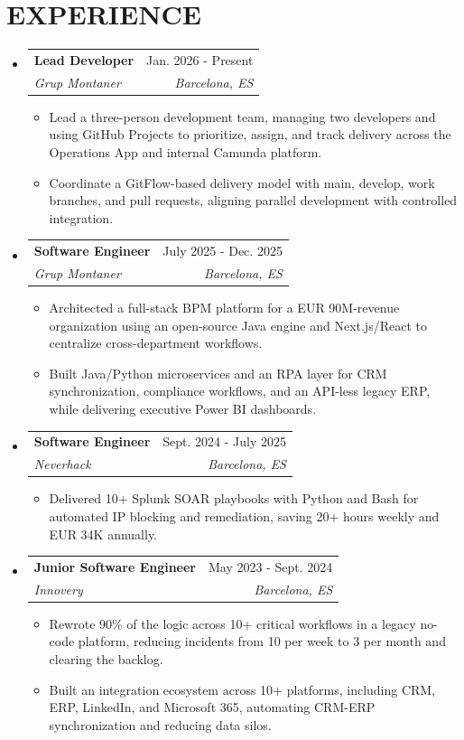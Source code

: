 \documentclass[letterpaper,11pt]{article}
\makeatletter
\newcommand{\resumeItem}[1]{
  \item\small{
    {#1 \vspace{-2pt}}
  }
}
\newcommand{\resumeSubheading}[4]{
  \vspace{-2pt}\item
    \begin{tabular*}{0.97\textwidth}[t]{l@{\extracolsep{\fill}}r}
      \textbf{#1} & #2 \\
      \textit{\small#3} & \textit{\small #4} \\
    \end{tabular*}\vspace{-7pt}
}
\newcommand{\resumeSubHeadingListStart}{\begin{itemize}[leftmargin=0.15in, label={}]}
\newcommand{\resumeSubHeadingListEnd}{\end{itemize}}
\newcommand{\resumeItemListStart}{\begin{itemize}}
\newcommand{\resumeItemListEnd}{\end{itemize}\vspace{-5pt}}
\makeatother
\begin{document}
\section{EXPERIENCE}
  \resumeSubHeadingListStart
    \resumeSubheading
      {Lead Developer}{Jan. 2026 - Present}
      {Grup Montaner}{Barcelona, ES}
      \resumeItemListStart
        \resumeItem{Lead a three-person development team, managing two developers and using GitHub Projects to prioritize, assign, and track delivery across the Operations App and internal Camunda platform.}
        \resumeItem{Coordinate a GitFlow-based delivery model with main, develop, work branches, and pull requests, aligning parallel development with controlled integration.}
      \resumeItemListEnd
    \resumeSubheading
      {Software Engineer}{July 2025 - Dec. 2025}
      {Grup Montaner}{Barcelona, ES}
      \resumeItemListStart
        \resumeItem{Architected a full-stack BPM platform for a EUR 90M-revenue organization using an open-source Java engine and Next.js/React to centralize cross-department workflows.}
        \resumeItem{Built Java/Python microservices and an RPA layer for CRM synchronization, compliance workflows, and an API-less legacy ERP, while delivering executive Power BI dashboards.}
      \resumeItemListEnd
    \resumeSubheading
      {Software Engineer}{Sept. 2024 - July 2025}
      {Neverhack}{Barcelona, ES}
      \resumeItemListStart
        \resumeItem{Delivered 10+ Splunk SOAR playbooks with Python and Bash for automated IP blocking and remediation, saving 20+ hours weekly and EUR 34K annually.}
      \resumeItemListEnd
    \resumeSubheading
      {Junior Software Engineer}{May 2023 - Sept. 2024}
      {Innovery}{Barcelona, ES}
      \resumeItemListStart
        \resumeItem{Rewrote 90\% of the logic across 10+ critical workflows in a legacy no-code platform, reducing incidents from 10 per week to 3 per month and clearing the backlog.}
        \resumeItem{Built an integration ecosystem across 10+ platforms, including CRM, ERP, LinkedIn, and Microsoft 365, automating CRM-ERP synchronization and reducing data silos.}
      \resumeItemListEnd
  \resumeSubHeadingListEnd
\end{document}
